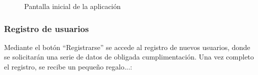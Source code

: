 \begin{figure} [!htb]
	\centering
	\caption{Pantalla inicial de la aplicación}
	\label{fig:pantallaInicial}
\end{figure}

\FloatBarrier
\subsubsection{Registro de usuarios}

Mediante el botón ``Registrarse'' se accede al registro de nuevos usuarios, donde se solicitarán una serie de datos de obligada cumplimentación. Una vez completo el registro, se recibe un pequeño regalo...\smiley:

